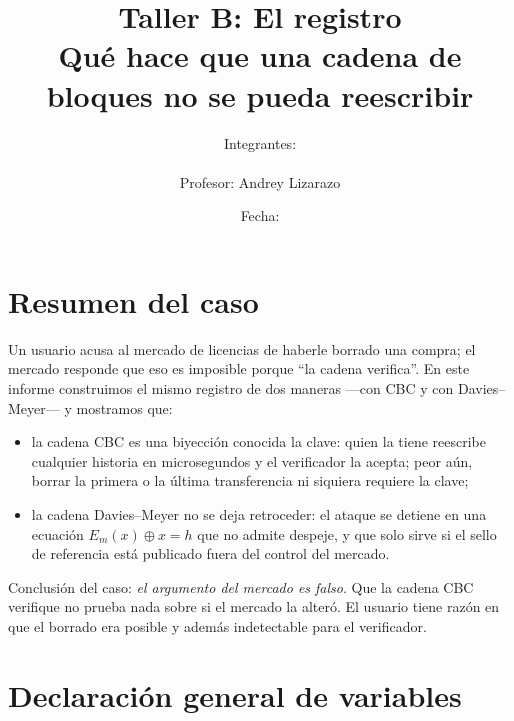 \documentclass[11pt,letterpaper]{article}
\title{\textbf{Taller B: El registro}\\[2pt]
\large Qué hace que una cadena de bloques no se pueda reescribir}
\author{Integrantes: \underline{\hspace{3.5cm}}\quad \underline{\hspace{3.5cm}}\\[4pt]
\underline{\hspace{3.5cm}}\quad \underline{\hspace{3.5cm}}\\[6pt]
Profesor: Andrey Lizarazo}
\date{Fecha: \underline{\hspace{3cm}}}
\newcommand{\xor}{\oplus}
\begin{document}
\maketitle
\thispagestyle{fancy}

\section*{Resumen del caso}

Un usuario acusa al mercado de licencias de haberle borrado una compra; el mercado responde que
eso es imposible porque ``la cadena verifica''. En este informe construimos el mismo registro de
dos maneras ---con CBC y con Davies--Meyer--- y mostramos que:
\begin{itemize}[itemsep=1pt]
  \item la cadena CBC es una biyección conocida la clave: quien la tiene reescribe cualquier
        historia en microsegundos y el verificador la acepta; peor aún, borrar la primera o la
        última transferencia ni siquiera requiere la clave;
  \item la cadena Davies--Meyer no se deja retroceder: el ataque se detiene en una ecuación
        $E_{m}(x)\xor x = h$ que no admite despeje, y que solo sirve si el sello de referencia
        está publicado fuera del control del mercado.
\end{itemize}
Conclusión del caso: \emph{el argumento del mercado es falso}. Que la cadena CBC verifique no prueba
nada sobre si el mercado la alteró. El usuario tiene razón en que el borrado era posible y además indetectable
para el verificador.

\section*{Declaración general de variables}
\end{document}
